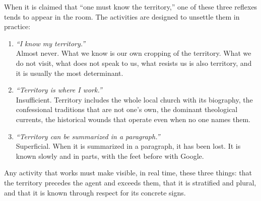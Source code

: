 \documentclass[11pt, a4paper]{article}
\begin{document}
When it is claimed that ``one must know the territory,'' one of these three reflexes tends to appear in the room. The activities are designed to unsettle them in practice:

\begin{enumerate}[label={\color{territorioTierra}\arabic*.}]
  \item \emph{``I know my territory.''} \\
        Almost never. What we know is our own cropping of the territory. What we do not visit, what does not speak to us, what resists us is also territory, and it is usually the most determinant.
  \item \emph{``Territory is where I work.''} \\
        Insufficient. Territory includes the whole local church with its biography, the confessional traditions that are not one's own, the dominant theological currents, the historical wounds that operate even when no one names them.
  \item \emph{``Territory can be summarized in a paragraph.''} \\
        Superficial. When it is summarized in a paragraph, it has been lost. It is known slowly and in parts, with the feet before with Google.
\end{enumerate}

Any activity that works must make visible, in real time, these three things: that the territory precedes the agent and exceeds them, that it is stratified and plural, and that it is known through respect for its concrete signs.

\vspace{1.5em}
\end{document}
